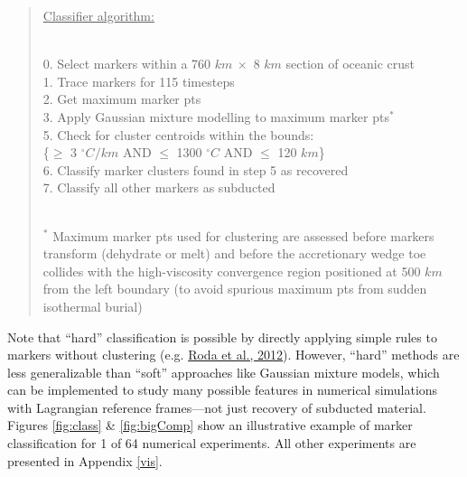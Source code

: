 \begin{quote}
\uline{Classifier algorithm:}\\
\strut \\
\hspace*{0.333em}0. Select markers within a 760 \(km\ \times\) 8 \(km\) section of oceanic crust\\
\hspace*{0.333em}1. Trace markers for 115 timesteps\\
\hspace*{0.333em}2. Get maximum marker \glspl{pt}\\
\hspace*{0.333em}3. Apply Gaussian mixture modelling to maximum marker \glspl{pt}\(^*\)\\
\hspace*{0.333em}5. Check for cluster centroids within the bounds:\\
\hspace*{0.333em}\hspace*{0.333em}\hspace*{0.333em}\hspace*{0.333em}\{\(\geq\) 3 \(^\circ C/km\) AND \(\leq\) 1300 \(^\circ C\) AND \(\leq\) 120 \(km\)\}\\
\hspace*{0.333em}6. Classify marker clusters found in step 5 as recovered\\
\hspace*{0.333em}7. Classify all other markers as subducted\\
\strut \\
\hspace*{0.333em}\(^*\) Maximum marker \glspl{pt} used for clustering are assessed before markers transform (dehydrate or melt) and before the accretionary wedge toe collides with the high-viscosity convergence region positioned at 500 \(km\) from the left boundary (to avoid spurious maximum \glspl{pt} from sudden isothermal burial)
\end{quote}

\noindent Note that ``hard'' classification is possible by directly applying simple rules to markers without clustering (e.g. \protect\hyperlink{ref-roda2012}{Roda et al., 2012}). However, ``hard'' methods are less generalizable than ``soft'' approaches like Gaussian mixture models, which can be implemented to study many possible features in numerical simulations with Lagrangian reference frames---not just recovery of subducted material. Figures \ref{fig:class} \& \ref{fig:bigComp} show an illustrative example of marker classification for 1 of 64 numerical experiments. All other experiments are presented in Appendix \ref{vis}.



